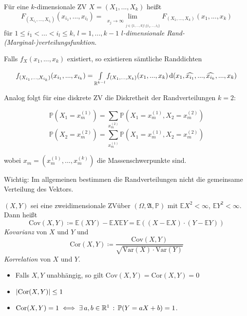 \documentclass{cheat-sheet}
\newcommand{\Alg}{\mathfrak{A}} %
\renewcommand{\P}{\mathbb{P}} %
\newcommand{\E}{\mathbb{E}} %
\newcommand{\Var}{\mathrm{Var}} %
\newcommand{\cov}{\mathrm{Cov}} %
\newcommand{\cor}{\mathrm{Cor}} %
\begin{document}
\begin{defn}
  Für eine $k$-dimensionale ZV $X = (X_1, ..., X_k)$ heißt
  \[ F_{(X_{i_1}, ..., X_{i_l})}(x_{i_1}, ..., x_{i_l}) = \lim_{\substack{x_j \to \infty}_{j \in \{ 1, ..., k\} \setminus \{ i_1, ..., i_l \}}} F_(X_1, ..., X_k)(x_1, ..., x_k) \]
  für $1 \leq i_1 < ... < i_l \leq k$, $l = 1, ..., k-1$ \emph{$l$-dimensionale Rand-(Marginal-)verteilungsfunktion}.
\end{defn}

Falls $f_X(x_1, ..., x_k)$ existiert, so existieren sämtliche Randdichten

\[ f_{(X_{i_1}, ..., X_{i_k})}(x_{i_1}, ..., x_{i_k}) = {\textstyle \int\limits_{\mathbb{R}^{k-l}}^{}} f_{(X_1, ..., X_k)}(x_1, ..., x_k) \,\mathrm{d} (x_1, \widehat{x_{i_1}}, ..., \widehat{x_{i_k}}, ..., x_k) \]

Analog folgt für eine diskrete ZV die Diskretheit der Randverteilungen $k=2$:

\[ \P(X_1 = x_m^{(1)}) = \sum_{x_m^{(2)}} \P(X_1 = x_m^{(1)}, X_2 = x_m^{(2)}) \]
\[ \P(X_2 = x_m^{(2)}) = \sum_{x_m^{(1)}} \P(X_1 = x_m^{(1)}, X_2 = x_m^{(2)}) \]

wobei $x_m = (x_m^{(1)}, ..., x_m^{(k)})$ die Massenschwerpunkte sind.

Wichtig: Im allgemeinen bestimmen die Randverteilungen nicht die gemeinsame Verteilung des Vektors.



\begin{defn}
  $(X, Y)$ sei eine zweidimensionale ZVüber $(\Omega, \Alg, \P)$ mit $\E X^2 < \infty$, $\E Y^2 < \infty$. Dann heißt
  \[ \cov(X, Y) \coloneqq \E(XY) - \E X \E Y = \E ((X - \E X) \cdot (Y - \E Y)) \]
  \emph{Kovarianz} von $X$ und $Y$ und
  \[ \cor(X, Y) \coloneqq \frac{\cov(X, Y)}{\sqrt{\Var(X) \cdot \Var(Y)}} \]
  \emph{Korrelation} von $X$ und $Y$.
\end{defn}

\begin{satz}
  \begin{itemize}
    \item Falls $X, Y$ unabhängig, so gilt $\cov(X, Y) = \cor(X, Y) = 0$
    \item $\abs{\cor(X, Y)} \leq 1$
    \item $\cor(X, Y) = 1 \iff \exists \, a, b \in \R^1 \,:\, \P(Y = aX + b) = 1$.
  \end{itemize}
\end{satz}
\end{document}
